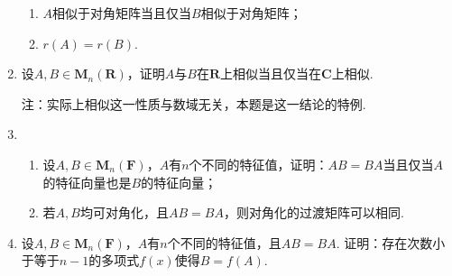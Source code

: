 \begin{enumerate}
\begin{enumerate}
              \item $A$相似于对角矩阵当且仅当$B$相似于对角矩阵；

              \item $r(A)=r(B)$.
          \end{enumerate}

    \item 设$A,B\in \mathbf{M}_n(\mathbf{R})$，证明$A$与$B$在$\mathbf{R}$上相似当且仅当在$\mathbf{C}$上相似.

          {\kaishu 注：实际上相似这一性质与数域无关，本题是这一结论的特例.}

    \item \begin{enumerate}
              \item 设$A,B\in \mathbf{M}_n(\mathbf{F})$，$A$有$n$个不同的特征值，证明：$AB=BA$当且仅当$A$的特征向量也是$B$的特征向量；

              \item 若$A,B$均可对角化，且$AB=BA$，则对角化的过渡矩阵可以相同.
          \end{enumerate}

    \item 设$A,B\in \mathbf{M}_n(\mathbf{F})$，$A$有$n$个不同的特征值，且$AB=BA$. 证明：存在次数小于等于$n-1$的多项式$f(x)$使得$B=f(A)$.
\end{enumerate}
